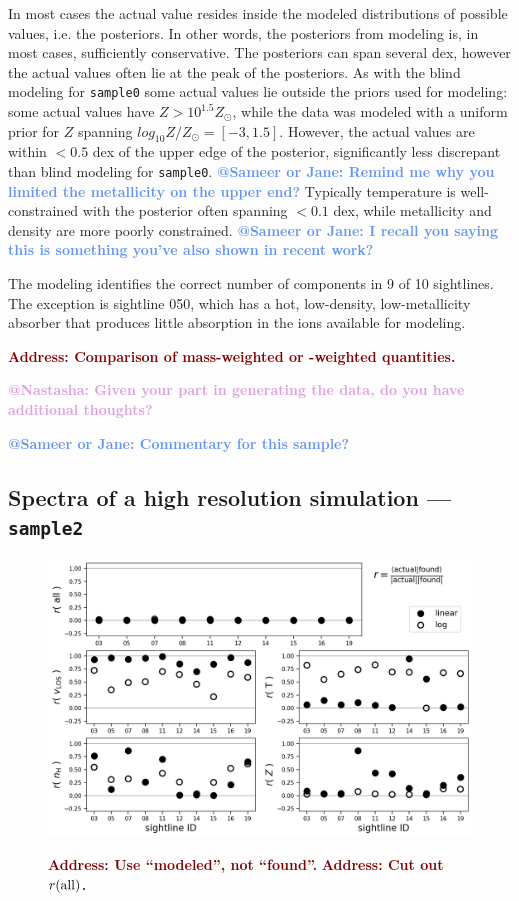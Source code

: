 \documentclass[fleqn,usenatbib]{mnras}
\makeatletter
\newcommand{\todo}[1]{\textcolor{Maroon}{\textbf{Address: #1}}}
\newcommand{\atsameer}[1]{\textcolor{CornflowerBlue}{\textbf{@Sameer or Jane: #1}}}
\newcommand{\atnastasha}[1]{\textcolor{Plum}{\textbf{@Nastasha: #1}}}
\makeatother
\begin{document}
In most cases the actual value resides inside the modeled distributions of possible values, i.e. the posteriors.
In other words, the posteriors from modeling is, in most cases, sufficiently conservative.
The posteriors can span several dex, however the actual values often lie at the peak of the posteriors.
As with the blind modeling for \texttt{sample0} some actual values lie outside the priors used for modeling: some actual values have $Z > 10^{1.5} Z_\odot$, while the data was modeled with a uniform prior for $Z$ spanning $log_{10} Z/Z_\odot = [-3, 1.5]$.
However, the actual values are within $< 0.5$ dex of the upper edge of the posterior, significantly less discrepant than blind modeling for \texttt{sample0}.
\atsameer{Remind me why you limited the metallicity on the upper end?}
Typically temperature is well-constrained with the posterior often spanning $<0.1$ dex, while metallicity and density are more poorly constrained.
\atsameer{I recall you saying this is something you've also shown in recent work?}

The modeling identifies the correct number of components in 9 of 10 sightlines.
The exception is sightline 050, which has a hot, low-density, low-metallicity absorber that produces little absorption in the ions available for modeling.

\todo{Comparison of mass-weighted or -weighted quantities.}

\atnastasha{Given your part in generating the data, do you have additional thoughts?}

\atsameer{Commentary for this sample?}

\subsection{Spectra of a high resolution simulation --- \texttt{sample2}}
\label{s: results -- sample2}

\begin{figure}
    \centering
    \includegraphics[width=\textwidth]{figures/sample2/correlations.png}
    \label{f: high-res}
    \caption{
    \todo{Use ``modeled'', not ``found''.}
    \todo{Cut out $r( {\rm all} )$.}
    }
\end{figure}
\end{document}
